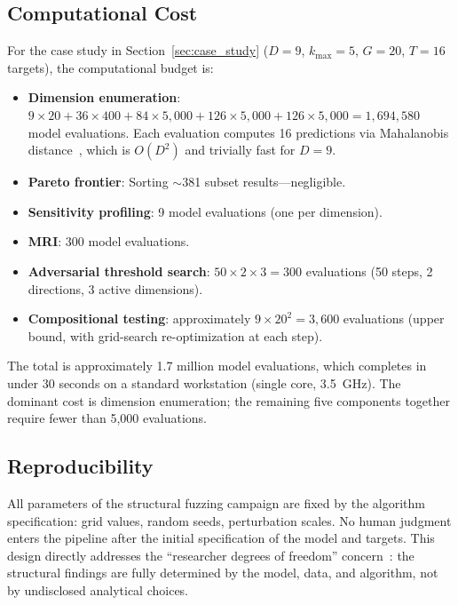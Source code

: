 \documentclass[manuscript,review,anonymous]{acmart}
\begin{document}
\subsection{Computational Cost}

For the case study in Section~\ref{sec:case_study} ($D = 9$, $k_{\max} = 5$, $G = 20$, $T = 16$ targets), the computational budget is:

\begin{itemize}
    \item \textbf{Dimension enumeration}: $9 \times 20 + 36 \times 400 + 84 \times 5{,}000 + 126 \times 5{,}000 + 126 \times 5{,}000 = 1{,}694{,}580$ model evaluations. Each evaluation computes 16 predictions via Mahalanobis distance~\cite{mahalanobis1936}, which is $O(D^2)$ and trivially fast for $D = 9$.
    \item \textbf{Pareto frontier}: Sorting $\sim$381 subset results---negligible.
    \item \textbf{Sensitivity profiling}: 9 model evaluations (one per dimension).
    \item \textbf{MRI}: 300 model evaluations.
    \item \textbf{Adversarial threshold search}: $50 \times 2 \times 3 = 300$ evaluations (50 steps, 2 directions, 3 active dimensions).
    \item \textbf{Compositional testing}: approximately $9 \times 20^2 = 3{,}600$ evaluations (upper bound, with grid-search re-optimization at each step).
\end{itemize}

The total is approximately 1.7 million model evaluations, which completes in under 30 seconds on a standard workstation (single core, 3.5~GHz).
The dominant cost is dimension enumeration; the remaining five components together require fewer than 5{,}000 evaluations.

\subsection{Reproducibility}

All parameters of the structural fuzzing campaign are fixed by the algorithm specification: grid values, random seeds, perturbation scales.
No human judgment enters the pipeline after the initial specification of the model and targets.
This design directly addresses the ``researcher degrees of freedom'' concern~\cite{simmons2011}: the structural findings are fully determined by the model, data, and algorithm, not by undisclosed analytical choices.
\end{document}
